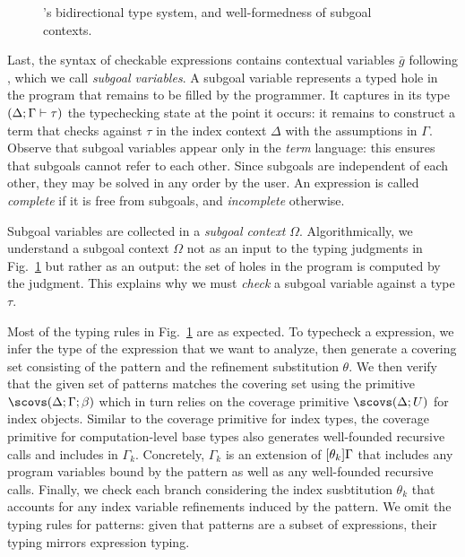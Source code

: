 \begin{figure}[tp]
  
  \caption{\Beluga's bidirectional type system, and well-formedness of subgoal contexts.}
  \label{fig:beluga-types}
\end{figure}

Last, the syntax of checkable expressions contains contextual variables $\bar g$
following \cite{Nanevski:ICML05,Boespflug:LFMTP11}, which we call
\emph{subgoal variables}.
A subgoal variable represents a typed hole in the program that remains to be
filled by the programmer.
It captures in its type $(\Delta; \Gamma \vdash \tau)$ the typechecking state at the point it occurs:
it remains to construct a term that checks against $\tau$ in the index context
$\Delta$ with the assumptions in $\Gamma$.
Observe that subgoal variables appear only in the \emph{term} language: this
ensures that subgoals cannot refer to each other.
Since subgoals are independent of each other, they may be solved in any order by
the user.
An expression is called \emph{complete} if it is free from subgoals, and
\emph{incomplete} otherwise.

Subgoal variables are collected in a \emph{subgoal context} $\Omega$.
Algorithmically, we understand a subgoal context $\Omega$ not as an input to the
typing judgments in Fig.~\ref{fig:beluga-types} but rather as an output: the set
of holes in the program is computed by the judgment.
This explains why we must \emph{check} a subgoal variable against a type $\tau$.

Most of the typing rules in Fig.~\ref{fig:beluga-types} are as expected.
To typecheck a \tcases expression, we infer the type of the expression that we
want to analyze, then generate a covering set consisting of the pattern and the
refinement substitution $\theta$.
We then verify that the given set of patterns matches the covering set using the
primitive $\scovs(\Delta;\Gamma;\beta)$ which in turn relies on the coverage
primitive $\scovs(\Delta;U)$ for index objects.
Similar to the coverage primitive for index types, the coverage primitive for
computation-level base types also generates well-founded recursive calls and
includes in $\Gamma_k$.
Concretely, $\Gamma_k$ is an extension of $[\theta_k]\Gamma$
that includes any program variables bound by the pattern as well as any
well-founded recursive calls.
Finally, we check each branch considering the index susbtitution $\theta_k$
that accounts for any index variable refinements induced by the pattern.
We omit the typing rules for patterns: given that patterns are a subset of
expressions, their typing mirrors expression typing.

